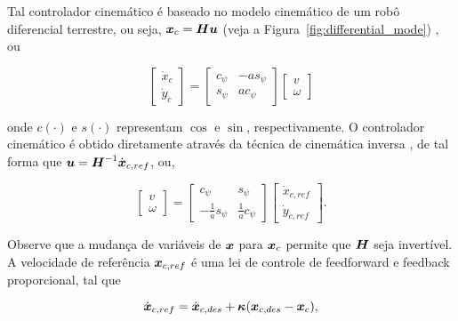     Tal controlador cinemático é baseado no modelo cinemático de um robô diferencial terrestre, ou seja, \( \boldsymbol{x}_c = \boldsymbol{H} \boldsymbol{u} \) (veja a Figura~\ref{fig:differential_mode}) \cite{Sarcinelli-Filho2023_2}, ou
    
    \begin{equation}
        \begin{bmatrix} \dot{x}_c \\ \dot{y}_c  \end{bmatrix} = \begin{bmatrix} c_\psi & -a s_\psi \\ s_\psi & a c_\psi   \end{bmatrix} \begin{bmatrix} v \\ \omega    \end{bmatrix}
        \label{eq:kinematics_differential}
    \end{equation}
    
    \noindent onde \( c(\cdot) \) e \( s(\cdot) \) representam \( \cos \) e \( \sin \), respectivamente. O controlador cinemático é obtido diretamente através da técnica de cinemática inversa \cite{Sarcinelli-Filho2023_4}, de tal forma que \( \boldsymbol{u} = \boldsymbol{H}^{-1} \dot{\boldsymbol{x}}_{c,ref} \), ou,
    
    \begin{equation}
       \begin{bmatrix} v \\ \omega    \end{bmatrix} =  \begin{bmatrix} c_\psi & s_\psi \\ -\frac{1}{a}s_\psi & \frac{1}{a} c_\psi   \end{bmatrix} \begin{bmatrix}\dot{x}_{c,ref} \\ \dot{y}_{c,ref}   \end{bmatrix}.
       \label{eq:kinematic_controller_differential}
    \end{equation}
    
    Observe que a mudança de variáveis de \( \boldsymbol{x} \) para \( \boldsymbol{x}_c \) permite que \( \boldsymbol{H} \) seja invertível. A velocidade de referência \( \boldsymbol{x}_{c,ref} \) é uma lei de controle de feedforward e feedback proporcional, tal que
    
    \begin{equation}
        \dot{\boldsymbol{x}}_{c,ref} = \dot{\boldsymbol{x}}_{c,des} + \boldsymbol{\kappa}(\boldsymbol{x}_{c,des} - \boldsymbol{x}_c),
        \label{eq:ff_fb_law}
    \end{equation}
    

